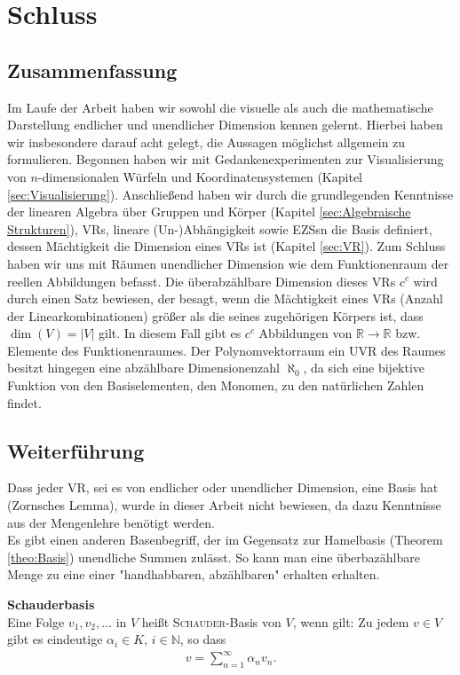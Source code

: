 \chapter{Schluss}
\label{sec:Schluss}
\section{Zusammenfassung}
Im Laufe der Arbeit haben wir sowohl die visuelle als auch die mathematische Darstellung endlicher und unendlicher Dimension kennen gelernt. Hierbei haben wir insbesondere darauf acht gelegt, die Aussagen möglichst allgemein zu formulieren. Begonnen haben wir mit Gedankenexperimenten zur Visualisierung von $n$-dimensionalen Würfeln und Koordinatensystemen (Kapitel \ref{sec:Visualisierung}). Anschließend haben wir durch die grundlegenden Kenntnisse der linearen Algebra über Gruppen und Körper (Kapitel \ref{sec:Algebraische Strukturen}), \aclp{VR}, lineare (Un-)Abhängigkeit sowie \aclp{EZS}n die Basis definiert, dessen Mächtigkeit die Dimension eines \acl{VR}s ist (Kapitel  \ref{sec:VR}). Zum Schluss haben wir uns mit Räumen unendlicher Dimension wie dem Funktionenraum der reellen Abbildungen befasst. Die überabzählbare Dimension dieses \acl{VR}s $c^c$ wird durch einen Satz bewiesen, der besagt, wenn die Mächtigkeit eines \acl{VR}s (Anzahl der Linearkombinationen) größer als die seines zugehörigen Körpers ist, dass $\dim(V)=|V|$ gilt. In diesem Fall gibt es $c^c$ Abbildungen von $\mathbb{R}\rightarrow\mathbb{R}$ bzw. Elemente des Funktionenraumes. Der Polynomvektorraum {\textendash} ein \acl{UVR} des Raumes {\textendash} besitzt hingegen eine abzählbare Dimensionenzahl $\aleph_0$, da sich eine bijektive Funktion von den Basiselementen, den Monomen, zu den natürlichen Zahlen findet.
\section{Weiterführung}

Dass jeder \acl{VR}, sei es von endlicher oder unendlicher Dimension, eine Basis hat (Zornsches Lemma), wurde in dieser Arbeit nicht bewiesen, da dazu Kenntnisse aus der Mengenlehre benötigt werden.
\\ Es gibt einen anderen Basenbegriff, der im Gegensatz zur Hamelbasis (Theorem \ref{theo:Basis}) unendliche Summen zulässt. So kann man eine überbazählbare Menge zu eine einer "handhabbaren, abzählbaren" erhalten erhalten.

\begin{definition}{\textbf{Schauderbasis}}
\\ Eine Folge $v_1,v_2,...$ in $V$ heißt \textsc{Schauder}-Basis von $V$, wenn gilt:
Zu jedem $v \in V$ gibt es eindeutige $\alpha_i \in K$, $i \in \mathbb{N}$, so dass 
\begin{align*}
v = \sum \limits_{n=1}^{\infty} \alpha_n v_n\text{.}
\end{align*}
\end{definition}
\cite[S. 762, 7.67]{Spring} 

